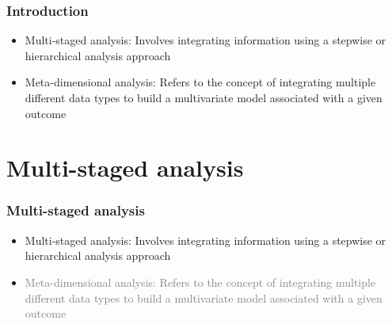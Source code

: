 \documentclass[10pt,xcolor=dvipsnames]{beamer}\usepackage[]{graphicx}\usepackage[]{color}
\begin{document}
\begin{frame}\frametitle{Introduction}

\begin{itemize}
\item \textcolor{OliveGreen}{Multi-staged analysis}: Involves integrating information using a stepwise or hierarchical analysis approach
\item \textcolor{OliveGreen}{Meta-dimensional analysis}: Refers to the concept of integrating multiple different data types to build a multivariate model associated with a given outcome
\end{itemize}
\end{frame}



\section{Multi-staged analysis}


\begin{frame}\frametitle{Multi-staged analysis}

\begin{itemize}
\item \textcolor{OliveGreen}{Multi-staged analysis}: Involves integrating information using a stepwise or hierarchical analysis approach
\item \textcolor{Gray}{Meta-dimensional analysis: Refers to the concept of integrating multiple different data types to build a multivariate model associated with a given outcome}
\end{itemize}
\end{frame}
\end{document}
